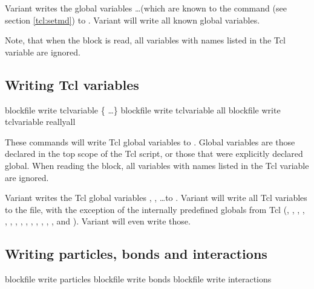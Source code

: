 Variant  writes the global variables 
 \dots (which are known to the  command (see
section \vref{tcl:setmd}) to . Variant  will
write all known global variables.

Note, that when the block is read, all variables with names listed in
the Tcl variable  are ignored.

\subsection{Writing Tcl variables}

\begin{essyntax}
   blockfile  write tclvariable \{
    \dots \}
   blockfile  write tclvariable all
   blockfile  write tclvariable reallyall
\end{essyntax}

These commands will write Tcl global variables to .
Global variables are those declared in the top scope of the Tcl
script, or those that were explicitly declared global.  When reading
the block, all variables with names listed in the Tcl variable
 are ignored.

Variant  writes the Tcl global variables ,
, \dots to . Variant  will write
all Tcl variables to the file, with the exception of the internally
predefined globals from Tcl (, ,
, , , ,
, , , ,
, , , ,
 and ). Variant  will
even write those.

\subsection{Writing particles, bonds and interactions}
\begin{essyntax}
   blockfile  write particles 
   
   blockfile  write bonds 
   blockfile  write interactions
\end{essyntax}

